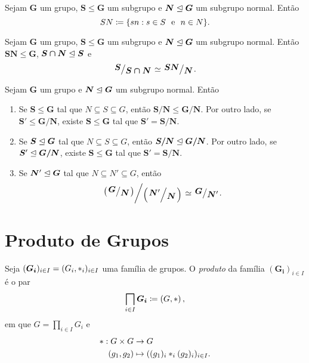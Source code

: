 \begin{defi}
Sejam $\bm G$ um grupo, $\bm S \leq \bm G$ um subgrupo e $\bm N \mathrel{\unlhd} \bm G$ um subgrupo normal. Então
	\begin{equation*}
	SN \coloneqq \{sn : s \in S \e n \in N\}.
	\end{equation*}
\end{defi}

\begin{teo}
Sejam $\bm G$ um grupo, $\bm S \leq \bm G$ um subgrupo e $\bm N \mathrel{\unlhd} \bm G$ um subgrupo normal. Então $\bm{SN} \leq \bm G$, $\bm{S \cap N} \mathrel{\unlhd} \bm S$ e
	\begin{equation*}
	\bm{\quo{S}{S \cap N}} \simeq \bm{\quo{SN}{N}}.
	\end{equation*}
\end{teo}

\begin{teo}
Sejam $\bm G$ um grupo e $\bm N \mathrel{\unlhd} \bm G$ um subgrupo normal. Então
	\begin{enumerate}
	\item Se $\bm S \leq \bm G$ tal que $N \subseteq S \subseteq G$, então $\bm{S/N} \leq \bm{G/N}$. Por outro lado, se $\bm S' \leq \bm{G/N}$, existe $\bm S \leq \bm G$ tal que $\bm S' = \bm{S/N}$.
	\item Se $\bm S \mathrel{\unlhd} \bm G$ tal que $N \subseteq S \subseteq G$, então $\bm{S/N} \mathrel{\unlhd} \bm{G/N}$. Por outro lado, se $\bm S' \mathrel{\unlhd} \bm{G/N}$, existe $\bm S \leq \bm G$ tal que $\bm S' = \bm{S/N}$.
	\item Se $\bm N' \mathrel{\unlhd} \bm G$ tal que $N \subseteq N' \subseteq G$, então
		\begin{equation*}
		\quo{\left(\quo{\bm G}{\bm N}\right)}{\left(\quo{\bm N'}{\bm N}\right)} \simeq \quo{\bm G}{\bm N'}.
		\end{equation*}
	\end{enumerate}
\end{teo}

\cleardoublepage
\section{Produto de Grupos}

\begin{defi}
Seja $(\bm{G_i})_{i \in I}=(G_i,\ast_i)_{i \in I}$ uma família de grupos. O \emph{produto} da família $(\bm{G_i})_{i \in I}$ é o par
	\begin{equation*}
	\prod_{i \in I} \bm{G_i} \coloneqq \left(G, \opb\right),
	\end{equation*}
em que $G = \prod_{i \in I} G_i$ e
	\begin{align*}
	\ast: G \times G &\to G \\
				(g_1,g_2) &\mapsto ((g_1)_i \ast_i (g_2)_i)_{i \in I}.
	\end{align*}
\end{defi}

